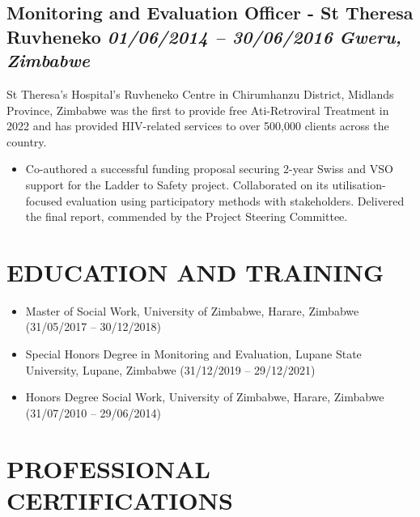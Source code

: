 \documentclass[
  10pt,
]{article}
\providecommand{\tightlist}{%
  \setlength{\itemsep}{0pt}\setlength{\parskip}{0pt}}
\begin{document}
\subsection{\texorpdfstring{Monitoring and Evaluation Officer - St Theresa Ruvheneko \emph{01/06/2014 -- 30/06/2016} \textbar{} \emph{Gweru, Zimbabwe}}{Monitoring and Evaluation Officer - St Theresa Ruvheneko 01/06/2014 -- 30/06/2016 \textbar{} Gweru, Zimbabwe}}\label{monitoring-and-evaluation-officer---st-theresa-ruvheneko-01062014-30062016-gweru-zimbabwe}

St Theresa’s Hospital's Ruvheneko Centre in Chirumhanzu District, Midlands Province, Zimbabwe was the first to provide free Ati-Retroviral Treatment in 2022 and has provided HIV-related services to over 500,000 clients across the country. 

\begin{itemize}
\tightlist
\item
Co-authored a successful funding proposal securing 2-year Swiss and VSO support for the Ladder to Safety project. Collaborated on its utilisation-focused evaluation using participatory methods with stakeholders. Delivered the final report, commended by the Project Steering Committee.
\end{itemize}

\vspace{0.5cm}


\section{EDUCATION AND TRAINING}\label{education-and-training}

\begin{itemize}[itemsep=0.25em, topsep=0.25em]

\item Master of Social Work, University of Zimbabwe, Harare, Zimbabwe (31/05/2017 – 30/12/2018)

\item Special Honors Degree in Monitoring and Evaluation, Lupane State University, Lupane, Zimbabwe (31/12/2019 – 29/12/2021) 
  
\item Honors Degree Social Work, University of Zimbabwe, Harare, Zimbabwe (31/07/2010 – 29/06/2014)
\end{itemize}

\vspace{0.5cm}

\section{PROFESSIONAL CERTIFICATIONS}\label{professional-certifications}
\end{document}

